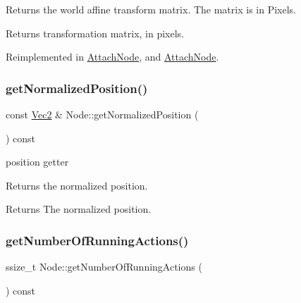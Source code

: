 Returns the world affine transform matrix. The matrix is in Pixels.

\begin{DoxyReturn}{Returns}
transformation matrix, in pixels. 
\end{DoxyReturn}


Reimplemented in \hyperlink{classAttachNode_a53970668bcd205b385e4dd0ae2af8039}{Attach\+Node}, and \hyperlink{classAttachNode_acb93bdd6d5c0e981b081513d3e307b49}{Attach\+Node}.

\mbox{\label{classNode_a9887ca06e6ecc7e19806927036bf8b57}} 
\subsubsection{\texorpdfstring{get\+Normalized\+Position()}{getNormalizedPosition()}}
{\footnotesize\ttfamily const \hyperlink{classVec2}{Vec2} \& Node\+::get\+Normalized\+Position (\begin{DoxyParamCaption}{ }\end{DoxyParamCaption}) const\hspace{0.3cm}{\ttfamily [virtual]}}



position getter 

Returns the normalized position.

\begin{DoxyReturn}{Returns}
The normalized position. 
\end{DoxyReturn}
\mbox{\label{classNode_a576446fef9c35a1a06535eb8949df2f3}} 
\subsubsection{\texorpdfstring{get\+Number\+Of\+Running\+Actions()}{getNumberOfRunningActions()}\hspace{0.1cm}{\footnotesize\ttfamily [1/2]}}
{\footnotesize\ttfamily ssize\+\_\+t Node\+::get\+Number\+Of\+Running\+Actions (\begin{DoxyParamCaption}{ }\end{DoxyParamCaption}) const}

